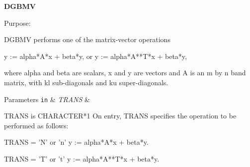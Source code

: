 {\bfseries D\+G\+B\+M\+V} 

\begin{DoxyParagraph}{Purpose\+: }
\begin{DoxyVerb} DGBMV  performs one of the matrix-vector operations

    y := alpha*A*x + beta*y,   or   y := alpha*A**T*x + beta*y,

 where alpha and beta are scalars, x and y are vectors and A is an
 m by n band matrix, with kl sub-diagonals and ku super-diagonals.\end{DoxyVerb}
 
\end{DoxyParagraph}

\begin{DoxyParams}[1]{Parameters}
\mbox{\tt in}  & {\em T\+R\+A\+N\+S} & \begin{DoxyVerb}          TRANS is CHARACTER*1
           On entry, TRANS specifies the operation to be performed as
           follows:

              TRANS = 'N' or 'n'   y := alpha*A*x + beta*y.

              TRANS = 'T' or 't'   y := alpha*A**T*x + beta*y.


\end{DoxyVerb}
\end{DoxyParams}
